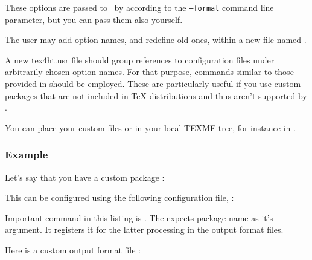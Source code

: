 These options are passed to \texfourht\ by \makefourht according to the \texttt{--format} 
command line parameter, but you can pass them also yourself. 

The user may add option names, and redefine old ones, within a new file named .

A new tex4ht.usr file should group references to  configuration files
under arbitrarily chosen option names. For that purpose,  commands
similar to those provided in  should be employed. 
These are particularly useful if you use custom packages that are not included in TeX distributions
and thus aren't supported by \texfourht.

You can place your custom  files or  in your local TEXMF tree, for instance
in .

\subsubsection{Example}

Let's say that you have a custom package :


This can be configured using the following configuration file, :


Important command in this listing is . The  expects
package name as it's argument. It registers it for the latter processing in the output format files.

Here is a custom output format file :


